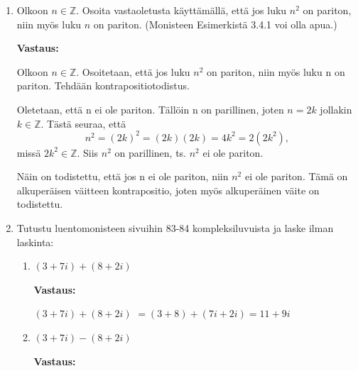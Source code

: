 \documentclass[a4paper,12pt]{article}
\begin{document}
\begin{enumerate}
\begin{enumerate}
\textbf{Vastaus:}

Voidaan todistaa vääräksi samoilla joukoilla A ja B kuin tehtävässä (a). 
\begin{itemize}
    \item Vasen puoli : $A^c = \{6\}$ ja $B^c = \{4\}$, joten $A^c\cup B^c=\{4,6\}$.
    \item Oikea puoli : $A\cup B = \{4,5,6\}$, joten $(A\cup B)^c = \emptyset$. $\{4,6\}\not=\emptyset$, joten väite ei päde. 
\end{itemize}
\end{enumerate}
 
\item 

Olkoon $n \in \mathbb{Z}$.
Osoita vastaoletusta k\"aytt\"am\"all\"a, ett\"a jos luku $n^2$ on pariton, niin my\"os luku $n$ on pariton. (Monisteen Esimerkist\"a 3.4.1 voi olla apua.) \vspace{1em}

\textbf{Vastaus:}

Olkoon $n\in\mathbb{Z}$. Osoitetaan, että jos luku $n^2$ on pariton, niin myös luku n on pariton. Tehdään kontrapositiotodistus. 

Oletetaan, että n ei ole pariton. Tällöin n on parillinen, joten $n=2k$ jollakin $k\in\mathbb{Z}$. Tästä seuraa, että 
\begin{equation*}
    n^2=(2k)^2=(2k)(2k)=4k^2=2(2k^2),
\end{equation*}
missä $2k^2\in\mathbb{Z}$. Siis $n^2$ on parillinen, ts. $n^2$ ei ole pariton. 

Näin on todistettu, että jos n ei ole pariton, niin $n^2$ ei ole pariton. Tämä on alkuperäisen väitteen kontrapositio, joten myös alkuperäinen väite on todistettu. \vspace{1em}
 
 \item Tutustu luentomonisteen sivuihin 83-84 kompleksiluvuista ja laske ilman laskinta:
\begin{enumerate}
    \item $(3+7i)+(8+2i)$\vspace{1em}

    \textbf{Vastaus:}

    $(3+7i)+(8+2i)$
    $= (3+8)+(7i+2i) = 11 + 9i$\vspace{1em}
    
    \item $(3+7i)-(8+2i)$\vspace{1em}

    \textbf{Vastaus:}
    

\end{enumerate}
\end{enumerate}
\end{document}
